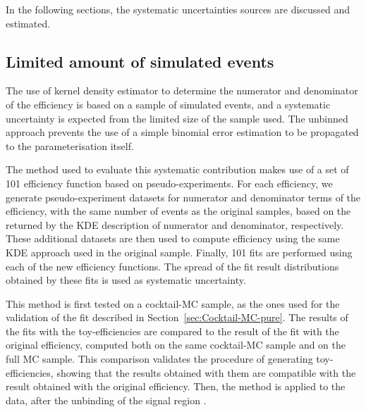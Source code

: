 In the following sections, the systematic uncertainties sources are discussed and estimated.

\subsection{Limited amount of simulated events}
\label{sec:sys-lim.MCstat}

The use of kernel density estimator to determine the numerator and denominator of the efficiency is based on a sample of simulated events, and a systematic uncertainty is expected from the limited size of the sample used.
The unbinned approach prevents the use of a simple binomial error estimation to be propagated to the parameterisation itself.


The method used to evaluate this systematic contribution makes use of a set of 101 efficiency function based on pseudo-experiments.
For each efficiency, we generate pseudo-experiment datasets for numerator and denominator terms of the efficiency, with the same number of events as the original samples, based on the \pdf returned by the KDE description of numerator and denominator, respectively.
These additional datasets are then used to compute efficiency using the same KDE approach used in the original sample.
Finally, 101 fits are performed using each of the new efficiency functions.
The spread of the fit result distributions obtained by these fits is used as systematic uncertainty.

This method is first tested on a cocktail-MC sample, as the ones used for the validation of the fit described in Section~\ref{sec:Cocktail-MC-pure}.
The results of the fits with the toy-efficiencies are compared to the result of the fit with the original efficiency, computed both on the same cocktail-MC sample and on the full MC sample.
This comparison validates the procedure of generating toy-efficiencies, showing that the results obtained with them are compatible with the result obtained with the original efficiency.
Then, the method is applied to the data, after the unbinding of the signal region .%


